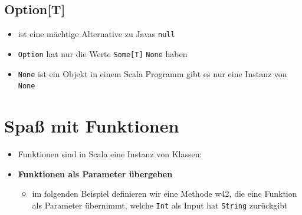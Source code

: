 \subsection{Option[T]}
\begin{itemize}
  \item ist eine mächtige Alternative zu Javas \texttt{null}
  \item \texttt{Option} hat nur die Werte \texttt{Some[T]} \oder 
  \texttt{None} haben
  \item \texttt{None} ist ein Objekt \und in einem Scala Programm gibt es
  nur eine Instanz von \texttt{None}
\end{itemize}


\section{Spaß mit Funktionen}
\begin{itemize}
  \item Funktionen sind in Scala eine Instanz von Klassen:
  
  
  
  \item \textbf{Funktionen als Parameter übergeben}
  \begin{itemize}
    \item im folgenden Beispiel definieren wir eine Methode w42, die eine
    Funktion als Parameter übernimmt, welche \texttt{Int} als Input hat 
    \und \texttt{String} zurückgibt
    
    
    
  \end{itemize}
\end{itemize}


